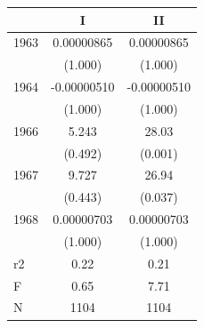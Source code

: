 \begin{tabular}{l*{2}{c}}
\hline\hline
            &\multicolumn{1}{c}{I}&\multicolumn{1}{c}{II}\\
\hline
1963        &  0.00000865&  0.00000865\\
            &     (1.000)&     (1.000)\\
[1em]
1964        & -0.00000510& -0.00000510\\
            &     (1.000)&     (1.000)\\
[1em]
1966        &       5.243&       28.03\\
            &     (0.492)&     (0.001)\\
[1em]
1967        &       9.727&       26.94\\
            &     (0.443)&     (0.037)\\
[1em]
1968        &  0.00000703&  0.00000703\\
            &     (1.000)&     (1.000)\\
\hline
r2          &        0.22&        0.21\\
F           &        0.65&        7.71\\
N           &        1104&        1104\\
\hline\hline
\end{tabular}
